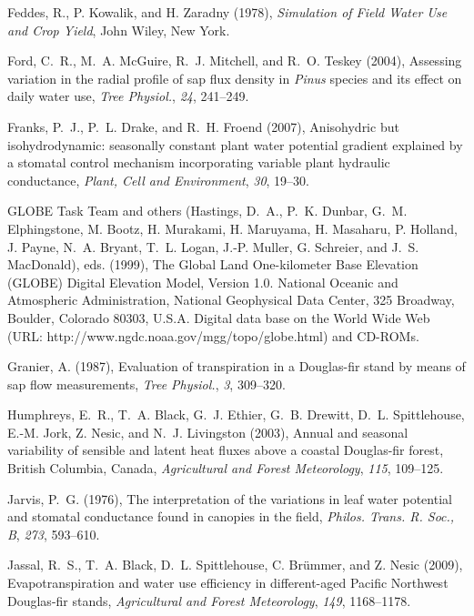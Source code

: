 Feddes, R., P. Kowalik, and H. Zaradny (1978), \textit{Simulation of Field Water Use and Crop Yield}, John Wiley, New York.

Ford, C.~R., M.~A. McGuire, R.~J. Mitchell, and R.~O. Teskey (2004), Assessing variation in the radial profile of sap flux density in \textit{Pinus} species and its effect on daily water use,
\textit{Tree Physiol.}, \textit{24}, 241--249.

Franks, P.~J., P.~L. Drake, and R.~H. Froend (2007), Anisohydric but isohydrodynamic: seasonally constant plant water potential gradient explained by a stomatal control mechanism incorporating variable plant hydraulic conductance,
\textit{Plant, Cell and Environment}, \textit{30}, 19--30.

GLOBE Task Team and others (Hastings, D.~A., P.~K. Dunbar, G.~M. Elphingstone, M. Bootz, H. Murakami, H. Maruyama, H. Masaharu, P. Holland, J. Payne, N.~A. Bryant, T.~L. Logan, J.-P. Muller, G. Schreier, and J.~S. MacDonald), eds. (1999), The Global Land One-kilometer Base Elevation (GLOBE) Digital Elevation Model, Version 1.0. National Oceanic and Atmospheric Administration, National Geophysical Data Center, 325 Broadway, Boulder, Colorado 80303, U.S.A. Digital data base on the World Wide Web (URL: http://www.ngdc.noaa.gov/mgg/topo/globe.html) and CD-ROMs.

Granier, A. (1987), Evaluation of transpiration in a Douglas-fir stand by means of sap flow measurements, 
\textit{Tree Physiol.}, \textit{3}, 309--320.

Humphreys, E.~R., T.~A. Black, G.~J. Ethier, G.~B. Drewitt, D.~L. Spittlehouse, E.-M. Jork, Z. Nesic, and N.~J. Livingston (2003), Annual and seasonal variability of sensible and latent heat fluxes above a coastal Douglas-fir forest, British Columbia, Canada, 
\textit{Agricultural and Forest Meteorology}, \textit{115}, 109--125.

Jarvis, P.~G. (1976), The interpretation of the variations in leaf water potential and stomatal conductance found in canopies in the field, 
\textit{Philos. Trans. R. Soc., B}, \textit{273}, 593--610.

Jassal, R.~S., T.~A. Black, D.~L. Spittlehouse, C. Br\"{u}mmer, and Z. Nesic (2009), Evapotranspiration and water use efficiency in different-aged Pacific Northwest Douglas-fir stands, 
\textit{Agricultural and Forest Meteorology}, \textit{149}, 1168--1178.

